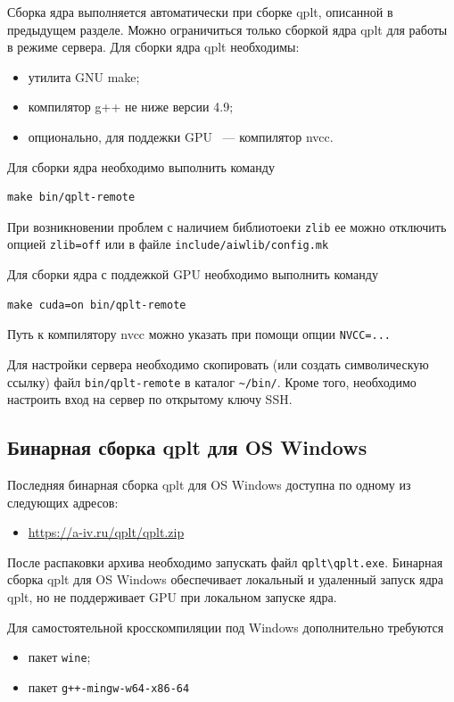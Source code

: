 \documentclass[12pt]{article}
\begin{document}
Сборка ядра выполняется автоматически при сборке qplt, описанной в предыдущем разделе.
Можно ограничиться только сборкой ядра qplt для работы в режиме сервера.
Для сборки ядра qplt необходимы:
\begin{itemize}
\item утилита GNU make;
\item компилятор g++ не ниже версии 4.9;
\item опционально, для поддежки GPU ~--- компилятор nvcc.
\end{itemize}

Для сборки ядра необходимо выполнить команду
\begin{verbatim}
make bin/qplt-remote
\end{verbatim}
При возникновении проблем с наличием библиотоеки \verb'zlib' ее можно отключить опцией \verb'zlib=off'
или в файле \verb'include/aiwlib/config.mk'

Для сборки ядра с поддежкой GPU необходимо выполнить команду
\begin{verbatim}
make cuda=on bin/qplt-remote
\end{verbatim}
Путь к компилятору nvcc можно указать при помощи опции \verb'NVCC=...'

Для настройки сервера необходимо скопировать (или создать символическую ссылку) файл \verb'bin/qplt-remote' в каталог \verb'~/bin/'.
Кроме того, необходимо настроить вход на сервер по открытому ключу SSH.


\subsection{Бинарная сборка qplt для OS Windows}
Последняя бинарная сборка qplt для OS  Windows доступна по одному из следующих адресов:
\begin{itemize}
\item \href{http://a-iv.ru/qplt/qplt.zip}{https://a-iv.ru/qplt/qplt.zip}
\end{itemize}
После распаковки архива необходимо запускать файл \verb'qplt\qplt.exe'.
Бинарная сборка qplt для OS  Windows обеспечивает локальный и удаленный запуск ядра qplt, но не поддерживает GPU при локальном запуске ядра.

Для самостоятельной кросскомпиляции под Windows дополнительно требуются
\begin{itemize}
\item пакет \verb'wine';
\item пакет \verb'g++-mingw-w64-x86-64'
\end{itemize}
\end{document}
